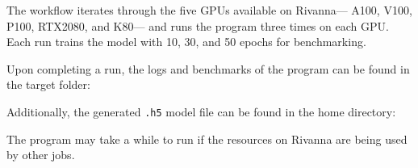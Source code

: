 \begin{Shaded}
\begin{Highlighting}[]
  \OperatorTok{=}
\end{Highlighting}
\end{Shaded}

The workflow iterates through the five GPUs available on Rivanna---
A100, V100, P100, RTX2080, and K80--- and runs the program three times
on each GPU. Each run trains the model with 10, 30, and 50 epochs for
benchmarking.

Upon completing a run, the logs and benchmarks of the program can be
found in the target folder:

\begin{Shaded}
\begin{Highlighting}[]
\end{Highlighting}
\end{Shaded}

Additionally, the generated \texttt{.h5} model file can be found in the
home directory:

\begin{Shaded}
\begin{Highlighting}[]
\end{Highlighting}
\end{Shaded}

The program may take a while to run if the resources on Rivanna are
being used by other jobs.
